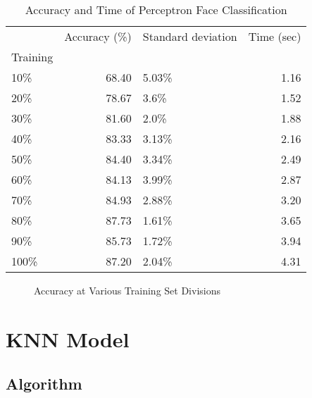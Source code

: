 \documentclass[10pt,parskip=half,
toc=sectionentrywithdots,
bibliography=totocnumbered,
captions=tableheading,numbers=noendperiod]{scrartcl}
\begin{document}
\begin{table}[H]
\caption{Accuracy and Time of Perceptron Face Classification}\label{tbl:tlabel}
\centering
\begin{adjustbox}{max width=\textwidth}
\begin{tabular}{lrlr}
\toprule
{} &  Accuracy (\%) & Standard deviation &  Time (sec) \\
Training &               &                    &             \\
\midrule
10\%      &         68.40 &              5.03\% &        1.16 \\
20\%      &         78.67 &               3.6\% &        1.52 \\
30\%      &         81.60 &               2.0\% &        1.88 \\
40\%      &         83.33 &              3.13\% &        2.16 \\
50\%      &         84.40 &              3.34\% &        2.49 \\
60\%      &         84.13 &              3.99\% &        2.87 \\
70\%      &         84.93 &              2.88\% &        3.20 \\
80\%      &         87.73 &              1.61\% &        3.65 \\
90\%      &         85.73 &              1.72\% &        3.94 \\
100\%     &         87.20 &              2.04\% &        4.31 \\
\bottomrule
\end{tabular}

\end{adjustbox}
\end{table}

\begin{figure}[H]\begin{center}\end{center}\caption{Accuracy at Various Training Set Divisions}\label{fig:flabel}\end{figure}

\hypertarget{knn-model}{%
\section{KNN Model}\label{knn-model}}

\hypertarget{algorithm}{%
\subsection{Algorithm}\label{algorithm}}
\end{document}
